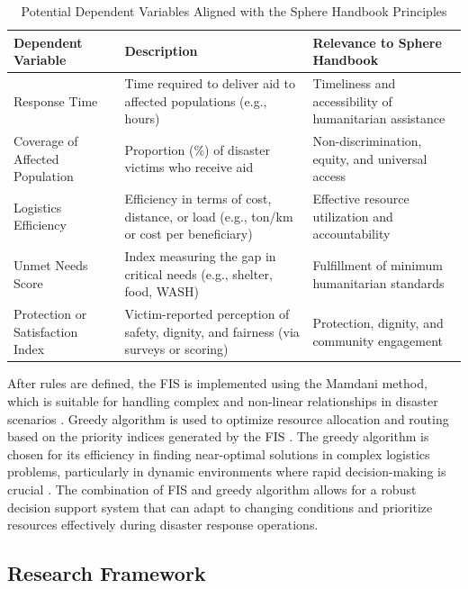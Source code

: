 \documentclass[journal,final,a4paper,twoside,11pt]{IEEEtran}
\begin{document}
\begin{table}[H]
\caption{Potential Dependent Variables Aligned with the Sphere Handbook Principles}
\begin{center}
\begin{tabular}{|p{2cm}|p{2cm}|p{2cm}|}
\hline
\textbf{Dependent Variable} & \textbf{Description} & \textbf{Relevance to Sphere Handbook} \\
\hline
Response Time & Time required to deliver aid to affected populations (e.g., hours) & Timeliness and accessibility of humanitarian assistance \\
\hline
Coverage of Affected Population & Proportion (\%) of disaster victims who receive aid & Non-discrimination, equity, and universal access \\
\hline
Logistics Efficiency & Efficiency in terms of cost, distance, or load (e.g., ton/km or cost per beneficiary) & Effective resource utilization and accountability \\
\hline
Unmet Needs Score & Index measuring the gap in critical needs (e.g., shelter, food, WASH) & Fulfillment of minimum humanitarian standards \\
\hline
Protection or Satisfaction Index & Victim-reported perception of safety, dignity, and fairness (via surveys or scoring) & Protection, dignity, and community engagement \\
\hline
\end{tabular}
\label{tab:dependent_variables_sphere}
\end{center}
\end{table}


After rules are defined, the FIS is implemented using the Mamdani method, which is suitable for handling complex and non-linear relationships in disaster scenarios \cite{herpratiwi2022implementation}. Greedy algorithm is used to optimize resource allocation and routing based on the priority indices generated by the FIS \cite{shirmarz2020adaptive}. The greedy algorithm is chosen for its efficiency in finding near-optimal solutions in complex logistics problems, particularly in dynamic environments where rapid decision-making is crucial \cite{hamidouglu2023game}. The combination of FIS and greedy algorithm allows for a robust decision support system that can adapt to changing conditions and prioritize resources effectively during disaster response operations. 
 

\subsection{Research Framework}
\end{document}
